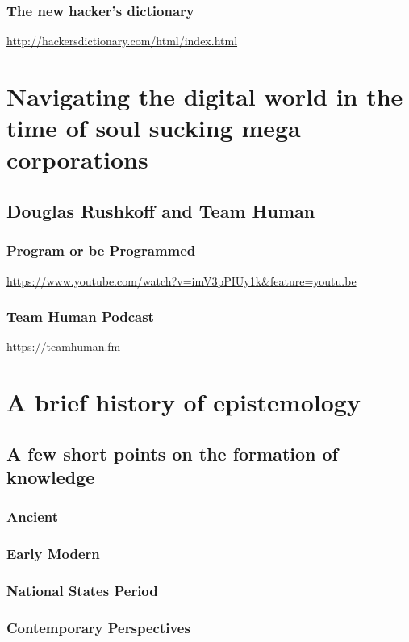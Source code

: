 \documentclass[11pt]{article}
\begin{document}
\subsubsection{The new hacker's dictionary}
\label{sec:orgb52387e}
\url{http://hackersdictionary.com/html/index.html}

\section{Navigating the digital world in the time of soul sucking mega corporations}
\label{sec:orge0776e8}

\subsection{Douglas Rushkoff and Team Human}
\label{sec:org9d0a5af}
\subsubsection{Program or be Programmed}
\label{sec:org7a64a2f}
\url{https://www.youtube.com/watch?v=imV3pPIUy1k\&feature=youtu.be}

\subsubsection{Team Human Podcast}
\label{sec:orgce0b60c}
\url{https://teamhuman.fm}

\section{A brief history of epistemology}
\label{sec:orgf073aa0}
\subsection{A few short points on the formation of knowledge}
\label{sec:org581777b}
\subsubsection{Ancient}
\label{sec:org20cafe1}
\subsubsection{Early Modern}
\label{sec:orgd5bec3d}
\subsubsection{National States Period}
\label{sec:org37ed487}
\subsubsection{Contemporary Perspectives}
\label{sec:orgd95881f}
\end{document}
